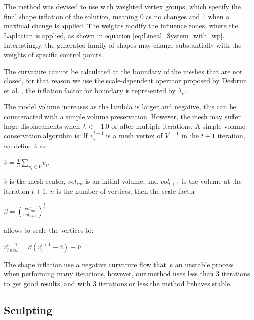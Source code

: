 \documentclass[10pt, conference]{IEEEtran}
\begin{document}
The method was devised to use with weighted vertex groups, which specify
the final shape inflation of the solution, meaning $0$ as no changes
and 1 when a maximal change is applied. The weights modify the influence
zones, where the Laplacian is applied, as shown in equation \ref{eq:Lineal_System_with_wp}.
Interestingly, the generated family of shapes may change substantially
with the weights of specific control points.

The curvature cannot be calculated at the boundary of the meshes that
are not closed, for that reason we use the scale-dependent operator
proposed by Desbrun et al. \cite{Desbrun1999}, the inflation factor
for boundary is represented by $\lambda_{e}$.

The model volume increases as the lambda is larger and negative, this
can be counteracted with a simple volume preservation. However, the
mesh may suffer large displacements when $\lambda<-1.0$ or after
multiple iterations. A simple volume conservation algorithm is: If
$v_{i}^{t+1}$ is a mesh vertex of $V^{t+1}$ in the $t+1$ iteration,
we define $\overline{v}$ as:

\begin{center}
$\overline{v}=\frac{1}{n}\underset{v_{i}\in V}{\sum}v_{i}$, 
\par\end{center}

$\overline{v}$ is the mesh center, $vol_{ini}$ is an initial volume,
and $vol_{t+1}$ is the volume at the iteration $t+1$, $n$ is the number of vertices, then the scale
factor

\begin{center}
$\beta=\left(\frac{vol_{ini}}{vol_{t+1}}\right)^{\frac{1}{3}}$
\par\end{center}

allows to scale the vertices to:

\begin{center}
$v_{i\, new}^{t+1}=\beta\left(v_{i}^{t+1}-\overline{v}\right)+\overline{v}$
\par\end{center}

The shape inflation use a negative curvature flow that is an unstable process 
when performing many iterations, however, our method uses less than 3 
iterations to get good results, and with 3 iterations or less the method behaves stable.

\subsection{Sculpting\label{sub:Sculpting}}
\end{document}
